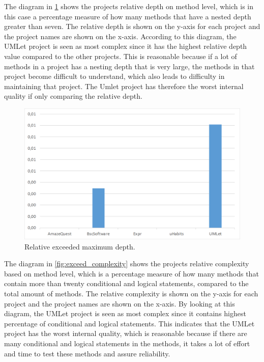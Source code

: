 \documentclass[conference]{IEEEtran}
\begin{document}
The diagram in \cref{fig:exceed_depth} shows the projects relative depth on method level, which is in this case a percentage measure of how many methods that have a nested depth greater than seven. The relative depth is shown on the y-axis for each project and the project names are shown on the x-axis. According to this diagram, the UMLet project is seen as most complex since it   has the highest relative depth value compared to the other projects. This is reasonable because if a lot of methods in a project has a nesting depth that is very large, the methods in that project become difficult to understand, which also leads to difficulty in maintaining that project. The Umlet project has therefore the worst internal quality if only comparing the relative depth. 
\begin{figure}
    \includegraphics[width=\columnwidth]{img/rel_exceeded_depth.png}
\caption{Relative exceeded maximum depth.}
\label{fig:exceed_depth}
\end{figure}


The diagram in \cref{fig:exceed_complexity} shows the projects relative complexity based on method level, which is a percentage measure of how many methods that contain more than twenty conditional and logical statements, compared to the total amount of methods. The relative complexity is shown on the y-axis for each project and the project names are shown on the x-axis. By looking at this diagram, the UMLet project is seen as most complex since it contains highest percentage of conditional and logical statements.  This indicates that the UMLet project has the worst internal quality, which is reasonable because if there are many conditional and logical statements in the methods, it takes a lot of effort and time to test these methods and assure reliability. 
\end{document}
